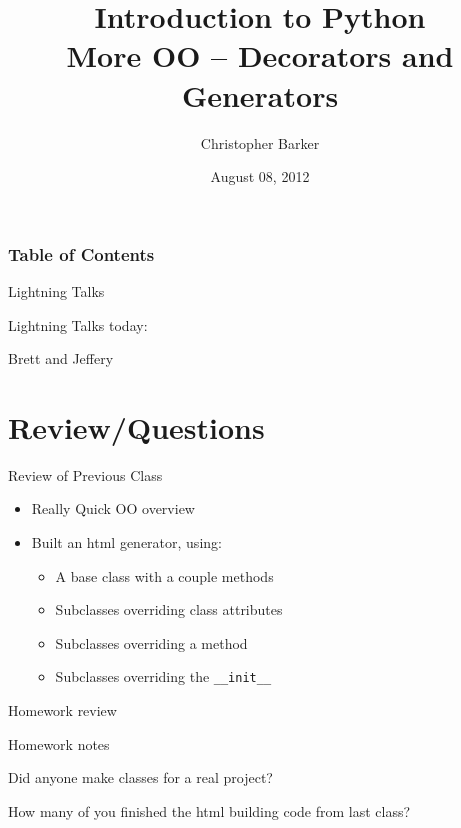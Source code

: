 \documentclass{beamer}
\title[Intro to Python: Week 7]{Introduction  to Python\\ More OO -- Decorators and Generators}
\author{Christopher Barker}
\institute{UW Continuing Education / Isilon}
\date{August 08, 2012}
\begin{document}
\begin{frame}
  \titlepage
\end{frame}

\begin{frame}
\frametitle{Table of Contents}
  \tableofcontents
\end{frame}

\begin{frame}{Lightning Talks}

{\centering

\vfill
{\LARGE Lightning Talks today:  }

\vfill
{\Huge Brett and Jeffery}

\vfill
}
\end{frame}

\section{Review/Questions}

\begin{frame}[fragile]{Review of Previous Class}

\begin{itemize}
  \item Really Quick OO overview
  \item Built an html generator, using: 
  \begin{itemize}
    \item A base class with a couple methods
    \item Subclasses overriding class attributes
    \item Subclasses overriding a method
    \item Subclasses overriding the \verb|__init__|
  \end{itemize}
\end{itemize}

\end{frame}


\begin{frame}{Homework review}

\vfill
{\LARGE Homework notes }

\vfill
{\Large Did anyone make classes for a real project? }

\vfill
{\Large How many of you finished the html building code from last class? }
\vfill

\end{frame}
\end{document}
